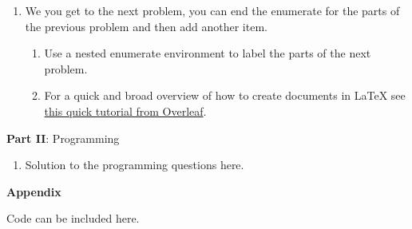 \documentclass[12pt]{article}
\begin{document}
\begin{enumerate}[leftmargin=\labelsep]
\begin{enumerate}
              \item For more details on putting math into {\LaTeX} documents you can see
                    \href{https://www.overleaf.com/learn/latex/Mathematical_expressions}{this page on Overleaf}.
          \end{enumerate}

    \item We you get to the next problem, you can end the enumerate for the parts of the previous problem and then add another item.
          \begin{enumerate}
              \item Use a nested enumerate environment to label the parts of the next problem.
              \item For a quick and broad overview of how to create documents in {\LaTeX} see
                    \href{https://www.overleaf.com/learn/latex/Learn_LaTeX_in_30_minutes}{this quick tutorial from Overleaf}.
          \end{enumerate}
\end{enumerate}

\center\large{\textbf{Part II}: Programming}

\begin{enumerate}[leftmargin=\labelsep,resume]
    \item Solution to the programming questions here.
\end{enumerate}

\center\large{\textbf{Appendix}\vskip 0.3cm}

Code can be included here.
\end{document}

